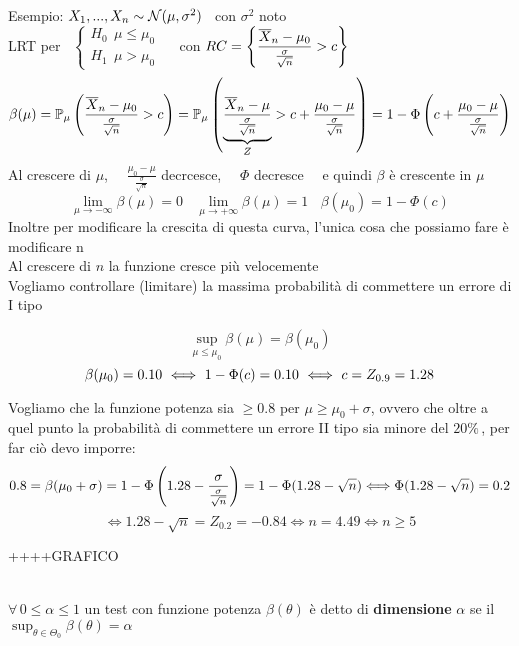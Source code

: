 \\

Esempio: $X_1,...,X_n \sim \mathcal N (\mu,\sigma^2)$ \ con  $\sigma^2$ noto\\
LRT per \ $\begin{cases}
    H_0 \ \ \mu\le \mu_0\\
    H_1 \ \ \mu>\mu_0
\end{cases}$ \ \ con $RC = \left\{ \dfrac{\overline{X}_n -\mu_0}{\tfrac{\sigma}{\sqrt{n}}} >c \right\}$
\[
\beta(\mu) = \mathbb P_{\mu}\left(\dfrac{\overline{X}_n -\mu_0}{\tfrac{\sigma}{\sqrt{n}}}>c\right) = \mathbb P_{\mu} \left(\underset{Z}{\underbrace{\dfrac{\overline{X}_n -\mu}{\tfrac{\sigma}{\sqrt{n}}}}} > c + \dfrac{\mu_0-\mu}{\tfrac{\sigma}{\sqrt{n}}}\right) = 1 - \Phi \left( c +\dfrac{\mu_0-\mu}{\tfrac{\sigma}{\sqrt{n}}}  \right)
\]
Al crescere di $\mu$, \ \ $\frac{\mu_0-\mu}{\tfrac{\sigma}{\sqrt{n}}}$ decrcesce, \ \ $\Phi$ decresce \ \ e quindi $\beta$ è crescente in $\mu$
\[
\lim_{\mu\to-\infty} \beta(\mu) =0 \ \ \ \  \lim_{\mu\to +\infty} \beta(\mu) =1 \ \ \ \ \beta(\mu_0)= 1-\Phi(c)
\]
Inoltre per modificare la crescita di questa curva, l'unica cosa che possiamo fare è modificare n\\
Al crescere di $n$ la funzione cresce più velocemente\\ 


Vogliamo controllare (limitare) la massima probabilità di commettere un errore di I tipo

\[\sup_{\mu\le\mu_0} \beta(\mu) = \beta(\mu_0)\]
\[\beta(\mu_0)=0.10 \ \Longleftrightarrow \ 1-\Phi(c)=0.10  \ \Longleftrightarrow \ c= Z_{0.9}=1.28\skipp\]

Vogliamo che la funzione potenza sia $\ge 0.8$ per $\mu\ge\mu_0+\sigma$, ovvero che oltre a quel punto la probabilità di commettere un errore II tipo sia minore del $20\%\,$, per far ciò devo imporre:
\[
0.8 = \beta(\mu_0+\sigma) = 1-\Phi\left(1.28-\dfrac{\sigma}{\tfrac{\sigma}{\sqrt{n}}}\right) = 1 - \Phi(1.28-\sqrt{n}) \Longleftrightarrow \Phi(1.28-\sqrt{n})=0.2
\]
\[
\Longleftrightarrow 1.28 -\sqrt{n} = Z_{0.2} = -0.84 \Longleftrightarrow n= 4.49 \Longleftrightarrow  n\ge 5\]

++++GRAFICO\\ \\


\begin{defi}
    $\forall \, 0\le \alpha\le 1 $ un test con funzione potenza $\beta(\theta)$ è detto di \textbf{dimensione} $\alpha$ se il $\displaystyle \sup_{\theta\in\Theta_0} \beta(\theta)=\alpha$
\end{defi}

